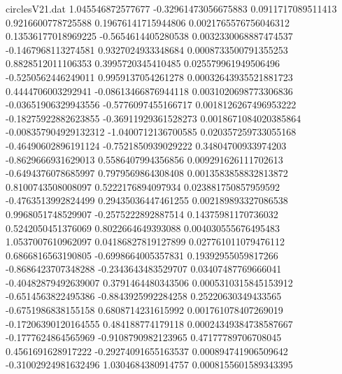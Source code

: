 \begin{filecontents}{circlesV21.dat}
1.045546872577677	-0.32961473056675883	0.0911717089511413
0.9216600778725588	0.19676141715944806	0.0021765576756046312
0.13536177018969225	-0.5654614405280538	0.0032330068887474537
-0.1467968113274581	0.9327024933348684	0.0008733500791355253
0.8828512011106353	0.3995720345410485	0.025579961949506496
-0.5250562446249011	0.9959137054261278	0.00032643935521881723
0.4444706003292941	-0.08613466876944118	0.0031020698773306836
-0.03651906329943556	-0.5776097455166717	0.0018126267496953222
-0.18275922882623855	-0.36911929361528273	0.0018671084020385864
-0.008357904929132312	-1.0400712136700585	0.020357259733055168
-0.46490602896191124	-0.7521850939029222	0.34804700933974203
-0.8629666931629013	0.5586407994356856	0.009291626111702613
-0.6494376078685997	0.7979569864308408	0.0013583858832813872
0.8100743508008097	0.5222176894097934	0.023881750857959592
-0.4763513992824499	0.29435036447461255	0.002189893327086538
0.9968051748529907	-0.2575222892887514	0.14375981170736032
0.5242050451376069	0.8022664649393088	0.004030555676495483
1.0537007610962097	0.04186827819127899	0.027761011079476112
0.6866816563190805	-0.6998664005357831	0.19392955059817266
-0.8686423707348288	-0.2343643483529707	0.03407487769666041
-0.40482879492639007	0.3791464480343506	0.0005310315845153912
-0.6514563822495386	-0.8843925992284258	0.25220630349433565
-0.6751986838155158	0.6808714231615992	0.001761078407269019
-0.17206390120164555	0.484188774179118	0.00024349384738587667
-0.1777624864565969	-0.9108790982123965	0.47177789706708045
0.4561691628917222	-0.29274091655163537	0.000894741906509642
-0.31002924981632496	1.0304684380914757	0.0008155601589343395
\end{filecontents}
